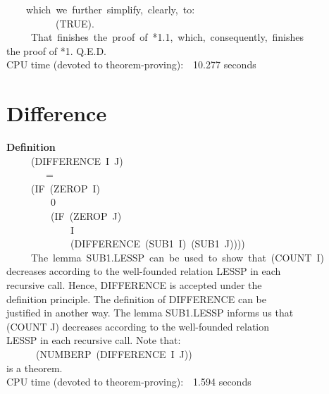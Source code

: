 \documentclass[10pt]{book}
\newenvironment{pubasis}{\begin{flushleft}}{\end{flushleft}}
\newcommand{\axiomordefinition}[1]{\vspace{6pt}\Large\textsf{\textbf{#1}}\normalsize}
\begin{document}
\begin{pubasis}
~~~~which~we~further~simplify,~clearly,~to:\\

~~~~~~~~~~(TRUE).\\

~~~~~That~finishes~the~proof~of~*1.1,~which,~consequently,~finishes\\
the proof of *1.  Q.E.D.\\

CPU time (devoted to theorem-proving):~~10.277 seconds\\
\end{pubasis}
\section{Difference}
\begin{pubasis}
\axiomordefinition{Definition}\\
~~~~~(DIFFERENCE~I~J)\\
~~~~~~~~=\\
~~~~~(IF~(ZEROP~I)\\
~~~~~~~~~0\\
~~~~~~~~~(IF~(ZEROP~J)\\
~~~~~~~~~~~~~I\\
~~~~~~~~~~~~~(DIFFERENCE~(SUB1~I)~(SUB1~J))))\\

~~~~~The~lemma~SUB1.LESSP~can~be~used~to~show~that~(COUNT~I)\\
decreases according to the well-founded relation LESSP in each\\
recursive call.  Hence, DIFFERENCE is accepted under the\\
definition principle.  The definition of DIFFERENCE can be\\
justified in another way.  The lemma SUB1.LESSP informs us that\\
(COUNT J) decreases according to the well-founded relation\\
LESSP in each recursive call.  Note that:\\
~~~~~~(NUMBERP~(DIFFERENCE~I~J))\\
is a theorem.\\

CPU time (devoted to theorem-proving):~~1.594 seconds\\
\end{pubasis}
\end{document}
